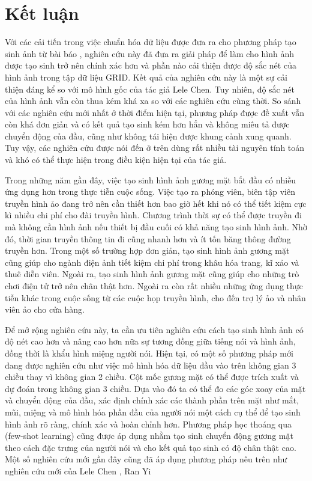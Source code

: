 \chapter{Kết luận}

Với các cải tiến trong việc chuẩn hóa dữ liệu được đưa ra cho phương pháp tạo sinh ảnh từ bài báo \cite{chen2019}, nghiên cứu này đã đưa ra giải pháp để làm cho hình ảnh được tạo sinh trở nên chính xác hơn và phần nào cải thiện được độ sắc nét của hình ảnh trong tập dữ liệu GRID. Kết quả của nghiên cứu này là một sự cải thiện đáng kể so với mô hình gốc của tác giả Lele Chen. Tuy nhiên, độ sắc nét của hình ảnh vẫn còn thua kém khá xa so với các nghiên cứu cùng thời. So sánh với các nghiên cứu mới nhất ở thời điểm hiện tại, phương pháp được đề xuất vẫn còn khá đơn giản và có kết quả tạo sinh kém hơn hẳn và không miêu tả được chuyển động của đầu, cũng như không tái hiện được khung cảnh xung quanh. Tuy vậy, các nghiên cứu được nói đến ở trên dùng rất nhiều tài nguyên tính toán và khó có thể thực hiện trong điều kiện hiện tại của tác giả.

Trong những năm gần đây, việc tạo sinh hình ảnh gương mặt bắt đầu có nhiều ứng dụng hơn trong thực tiễn cuộc sống. Việc tạo ra phóng viên, biên tập viên truyền hình ảo đang trở nên cần thiết hơn bao giờ hết khi nó có thể tiết kiệm cực kì nhiều chi phí cho đài truyền hình. Chương trình thời sự có thể được truyền đi mà không cần hình ảnh nếu thiết bị đầu cuối có khả năng tạo sinh hình ảnh. Nhờ đó, thời gian truyền thông tin đi cũng nhanh hơn và ít tốn băng thông đường truyền hơn. Trong một số trường hợp đơn giản, tạo sinh hình ảnh gương mặt cũng giúp cho ngành điện ảnh tiết kiệm chi phí trong khâu hóa trang, kĩ xảo và thuê diễn viên. Ngoài ra, tạo sinh hình ảnh gương mặt cũng giúp cho những trò chơi điện tử trở nên chân thật hơn. Ngoài ra còn rất nhiều những ứng dụng thực tiễn khác trong cuộc sống từ các cuộc họp truyền hình, cho đến trợ lý ảo và nhân viên ảo cho cửa hàng.

Để mở rộng nghiên cứu này, ta cần ưu tiên nghiên cứu cách tạo sinh hình ảnh có độ nét cao hơn và nâng cao hơn nữa sự tương đồng giữa tiếng nói và hình ảnh, đồng thời là khẩu hình miệng người nói. Hiện tại, có một số phương pháp mới đang được nghiên cứu như việc mô hình hóa dữ liệu đầu vào trên không gian 3 chiều thay vì không gian 2 chiều. Cột mốc gương mặt có thể được trích xuất và dự đoán trong không gian 3 chiều. Dựa vào đó ta có thể đo các góc xoay của mặt và chuyển động của đầu, xác định chính xác các thành phần trên mặt như mắt, mũi, miệng và mô hình hóa phần đầu của người nói một cách cụ thể để tạo sinh hình ảnh rõ ràng, chính xác và hoàn chỉnh hơn. Phương pháp học thoáng qua (few-shot learning) cũng được áp dụng nhằm tạo sinh chuyển động gương mặt theo cách đặc trưng của người nói và cho kết quả tạo sinh có độ chân thật cao. Một số nghiên cứu mới gần đây cũng đã áp dụng phương pháp nêu trên như nghiên cứu mới của Lele Chen \cite{chen2020}, Ran Yi \cite{ranyi}
